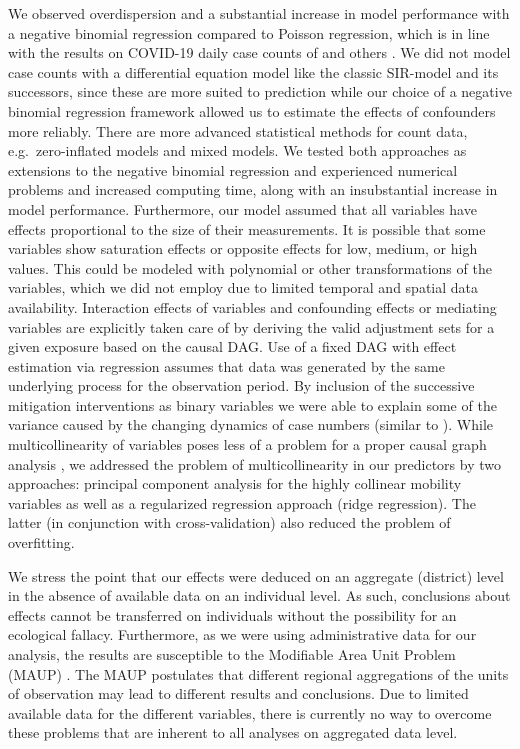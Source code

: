 \documentclass[]{elsarticle} %
\begin{document}
We observed overdispersion and a substantial increase in model performance with a negative binomial regression compared to Poisson regression, which is in line with the results on COVID-19 daily case counts of \citet{kraemer_effect_2020} and others \citep{liu_impact_2020, bannister-tyrrell_preliminary_2020, Islamm2743}. We did not model case counts with a differential equation model like the classic SIR-model \citep{kermack1991contributions} and its successors, since these are more suited to prediction \citep[e.g.][]{rkimodellierung} while our choice of a negative binomial regression framework allowed us to estimate the effects of confounders more reliably. There are more advanced statistical methods for count data, e.g.~zero-inflated models and mixed models. We tested both approaches as extensions to the negative binomial regression and experienced numerical problems and increased computing time, along with an insubstantial increase in model performance. Furthermore, our model assumed that all variables have effects proportional to the size of their measurements. It is possible that some variables show saturation effects or opposite effects for low, medium, or high values. This could be modeled with polynomial or other transformations of the variables, which we did not employ due to limited temporal and spatial data availability. Interaction effects of variables and confounding effects or mediating variables are explicitly taken care of by deriving the valid adjustment sets for a given exposure based on the causal DAG. Use of a fixed DAG with effect estimation via regression assumes that data was generated by the same underlying process for the observation period. By inclusion of the successive mitigation interventions as binary variables we were able to explain some of the variance caused by the changing dynamics of case numbers (similar to \citep{Islamm2743}). While multicollinearity of variables poses less of a problem for a proper causal graph analysis \citep{schisterman2017collinearitycausal}, we addressed the problem of multicollinearity in our predictors by two approaches: principal component analysis for the highly collinear mobility variables as well as a regularized regression approach (ridge regression). The latter (in conjunction with cross-validation) also reduced the problem of overfitting.

We stress the point that our effects were deduced on an aggregate (district) level in the absence of available data on an individual level. As such, conclusions about effects cannot be transferred on individuals without the possibility for an ecological fallacy. Furthermore, as we were using administrative data for our analysis, the results are susceptible to the Modifiable Area Unit Problem (MAUP) \citep{Openshaw1984}. The MAUP postulates that different regional aggregations of the units of observation may lead to different results and conclusions. Due to limited available data for the different variables, there is currently no way to overcome these problems that are inherent to all analyses on aggregated data level.
\end{document}
